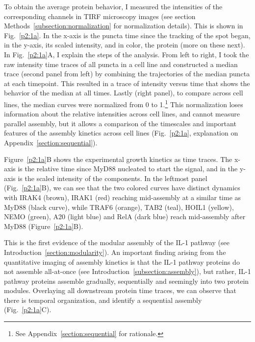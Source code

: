 To obtain the average protein behavior, I measured the intensities of the corresponding channels in TIRF microscopy images (see section Methods~\ref{subsection:normalization} for normalization details). This is shown in Fig.~\ref{p2:1a}. In the x-axis is the puncta time since the tracking of the spot began, in the y-axis, its scaled intensity, and in color, the protein (more on these next). In Fig.~\ref{p2:1a}A, I explain the steps of the analysis. From left to right, I took the raw intensity time traces of all puncta in a cell line and constructed a median trace (second panel from left) by combining the trajectories of the median puncta at each timepoint. This resulted in a trace of intensity versus time that shows the behavior of the median at all times. Lastly (right panel), to compare across cell lines, the median curves were normalized from 0 to 1.\footnote{See Appendix~\ref{section:sequential} for rationale.} This normalization loses information about the relative intensities across cell lines, and cannot measure parallel assembly, but it allows a comparison of the timescales and important features of the assembly kinetics across cell lines (Fig.~\ref{p2:1a}, explanation on Appendix~\ref{section:sequential}).

Figure~\ref{p2:1a}B shows the experimental growth kinetics as time traces. The x-axis is the relative time since MyD88 nucleated to start the signal, and in the y-axis is the scaled intensity of the components. In the leftmost panel (Fig.~\ref{p2:1a}B), we can see that the two colored curves have distinct dynamics with IRAK4 (brown), IRAK1 (red) reaching mid-assembly at a similar time as MyD88 (black curve), while TRAF6 (orange), TAB2 (teal), HOIL1 (yellow), NEMO (green), A20 (light blue) and RelA (dark blue) reach mid-assembly after MyD88 (Figure~\ref{p2:1a}B).

This is the first evidence of the modular assembly of the IL-1 pathway (see Introduction~\ref{section:modularity}). An important finding arising from the quantitative imaging of assembly kinetics is that the IL-1 pathway proteins do not assemble all-at-once (see Introduction~\ref{subsection:assembly}), but rather, IL-1 pathway proteins assemble gradually, sequentially and seemingly into two protein modules. Overlaying all downstream protein time traces, we can observe that there is temporal organization, and identify a sequential assembly (Fig.~\ref{p2:1a}C). 


